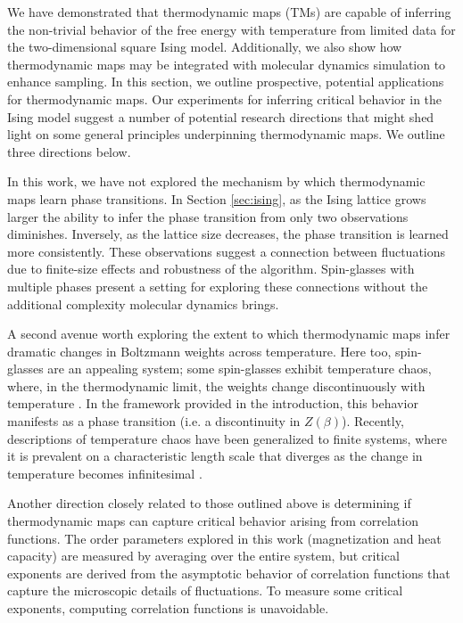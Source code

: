 \documentclass[9pt,twocolumn,twoside]{pnas-new}
\begin{document}
{We have demonstrated that thermodynamic maps (TMs) are capable of inferring the non-trivial behavior of the free energy with temperature from limited data for the two-dimensional square Ising model. Additionally, we also show how thermodynamic maps may be integrated with molecular dynamics simulation to enhance sampling. In this section, we outline prospective, potential applications for thermodynamic maps. Our experiments for inferring critical behavior in the Ising model suggest a number of potential research directions that might shed light on some general principles underpinning thermodynamic maps. We outline three directions below.

In this work, we have not explored the mechanism by which thermodynamic maps learn phase transitions. In Section \ref{sec:ising}, as the Ising lattice grows larger the ability to infer the phase transition from only two observations diminishes. Inversely, as the lattice size decreases, the phase transition is learned more consistently. These observations suggest a connection between fluctuations due to finite-size effects and robustness of the algorithm. Spin-glasses with multiple phases present a setting for exploring these connections without the additional complexity molecular dynamics brings.

A second avenue worth exploring the extent to which thermodynamic maps infer dramatic changes in Boltzmann weights across temperature. Here too, spin-glasses are an appealing system; some spin-glasses exhibit temperature chaos, where, in the thermodynamic limit, the weights change discontinuously with temperature \cite{ritort-temperature-chaos}. In the framework provided in the introduction, this behavior manifests as a phase transition (i.e. a discontinuity in $Z(\beta)$). Recently, descriptions of temperature chaos have been generalized to finite systems, where it is prevalent on a characteristic length scale that diverges as the change in temperature becomes infinitesimal \cite{parisi-temperature-chaos}.

Another direction closely related to those outlined above is determining if thermodynamic maps can capture critical behavior arising from correlation functions. The order parameters explored in this work (magnetization and heat capacity) are measured by averaging over the entire system, but critical exponents are derived from the asymptotic behavior of correlation functions that capture the microscopic details of fluctuations. To measure some critical exponents, computing correlation functions is unavoidable.

}
\end{document}
